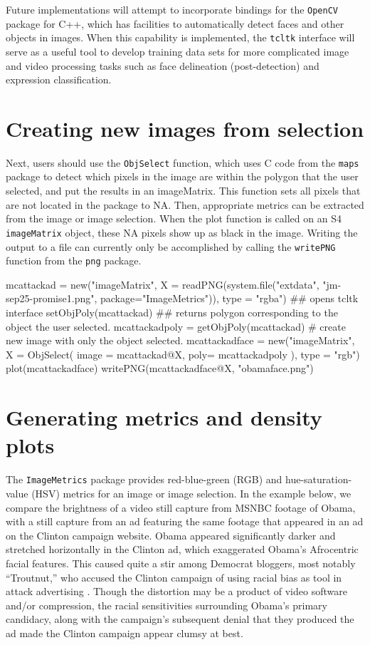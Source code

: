 \documentclass[12pt]{article}
\begin{document}
Future implementations will attempt to incorporate bindings for the \texttt{OpenCV} package for C++, which has facilities to automatically detect faces and other objects in images.  When this capability is implemented, the \texttt{tcltk} interface will serve as a useful tool to develop training data sets for more complicated image and video processing tasks such as face delineation (post-detection) and expression classification.  

\section{Creating new images from selection}
Next, users should use the \texttt{ObjSelect} function, which uses C code from the \texttt{maps} package to detect which pixels in the image are within the polygon that the user selected, and put the results in an imageMatrix.  This function sets all pixels that are not located in the package to NA.  Then, appropriate metrics can be extracted from the image or image selection.  When the plot function is called on an S4 \texttt{imageMatrix} object, these NA pixels show up as black in the image.  Writing the output to a file can currently only be accomplished by calling the \texttt{writePNG} function from the \texttt{png} package.

\begin{Schunk}
\begin{Sinput}
 mcattackad = new("imageMatrix", 
 	X = readPNG(system.file("extdata", "jm-sep25-promise1.png", 
 			package="ImageMetrics")), 
 	type = "rgba")
 ## opens tcltk interface
 setObjPoly(mcattackad) 
 ## returns polygon corresponding to the object the user selected.
 mcattackadpoly = getObjPoly(mcattackad) 
 # create new image with only the object selected.
 mcattackadface = new("imageMatrix", 
 	X = ObjSelect( image = mcattackad@X, poly= mcattackadpoly ), 
 	type = "rgb")
 plot(mcattackadface)
 writePNG(mcattackadface@X, "obamaface.png")
\end{Sinput}
\end{Schunk}

\section{Generating metrics and density plots}
The \texttt{ImageMetrics} package provides red-blue-green (RGB) and hue-saturation-value (HSV) metrics for an image or image selection.  In the example below, we compare the brightness of a video still capture from MSNBC footage of Obama, with a still capture from an ad featuring the same footage that appeared in an ad on the Clinton campaign website.  Obama appeared significantly darker and stretched horizontally in the Clinton ad, which exaggerated Obama's Afrocentric facial features.  This caused quite a stir among Democrat bloggers, most notably ``Troutnut,'' who accused the Clinton campaign of using racial bias as tool in attack advertising \citep{troutnut2008hillarys}.  Though the distortion may be a product of video software and/or compression, the racial sensitivities surrounding Obama's primary candidacy, along with the campaign's subsequent denial that they produced the ad \citep{fox2008questions} made the Clinton campaign appear clumsy at best.  
\end{document}
